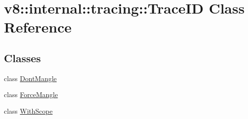 \hypertarget{classv8_1_1internal_1_1tracing_1_1TraceID}{}\section{v8\+:\+:internal\+:\+:tracing\+:\+:Trace\+ID Class Reference}
\label{classv8_1_1internal_1_1tracing_1_1TraceID}
\subsection*{Classes}
\begin{DoxyCompactItemize}
\item 
class \mbox{\hyperlink{classv8_1_1internal_1_1tracing_1_1TraceID_1_1DontMangle}{Dont\+Mangle}}
\item 
class \mbox{\hyperlink{classv8_1_1internal_1_1tracing_1_1TraceID_1_1ForceMangle}{Force\+Mangle}}
\item 
class \mbox{\hyperlink{classv8_1_1internal_1_1tracing_1_1TraceID_1_1WithScope}{With\+Scope}}
\end{DoxyCompactItemize}
